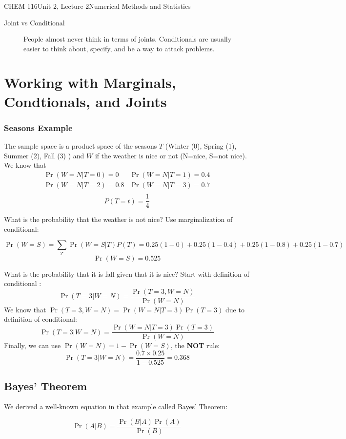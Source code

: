 \documentclass{article}
\begin{document}
\begin{tdoc}{CHEM 116}{Unit 2, Lecture 2}{Numerical Methods and Statistics}
\begin{description}
\item[Joint vs Conditional] People almost never think in terms of
  joints. Conditionals are usually easier to think about, specify, and
  be a way to attack problems.

\end{description}

 \section{Working with Marginals, Condtionals, and Joints}

\subsubsection{Seasons Example}

The sample space is a product space of the seasons $T$ (Winter (0), Spring
(1), Summer (2), Fall (3) ) and $W$ if the weather is nice or not (N=nice,
S=not nice). We know that
\[
\begin{array}{lr}
\Pr(W=N|T=0) = 0 & \Pr(W=N|T=1) = 0.4\\
\Pr(W=N|T=2) = 0.8 & \Pr(W=N|T=3) = 0.7\\
\end{array}
\]
\[
P(T=t) = \frac{1}{4}
\]

What is the probability that the weather is not nice? Use
marginalization of conditional:

\[
\Pr(W=S) = \sum_\mathcal{T} \Pr(W=S | T) P(T) = 0.25(1 - 0) + 0.25(1 - 0.4) + 0.25(1 - 0.8) + 0.25(1 - 0.7)
\]
\[
\Pr(W=S) = 0.525
\]

What is the probability that it is fall given that it is nice? Start with definition of conditional :
\[
\Pr(T=3|W=N) = \frac{\Pr(T=3, W=N)}{\Pr(W=N)}
\]
We know that $\Pr(T=3, W=N) = \Pr(W=N|T=3)\Pr(T=3)$ due to definition of conditional:
\[
\Pr(T=3|W=N) = \frac{\Pr(W=N|T=3)\Pr(T=3)}{\Pr(W=N)}
\]
Finally, we can use $\Pr(W=N) = 1 - \Pr(W=S)$, the {\bf NOT} rule:
\[
\Pr(T=3|W=N) = \frac{0.7\times 0.25}{1 - 0.525} = 0.368
\]

\subsection{Bayes' Theorem}

We derived a well-known equation in that example called Bayes' Theorem:

\begin{equation}
\Pr(A|B) = \frac{\Pr(B|A)\Pr(A)}{\Pr(B)}
\end{equation}


\end{tdoc}
\end{document}
